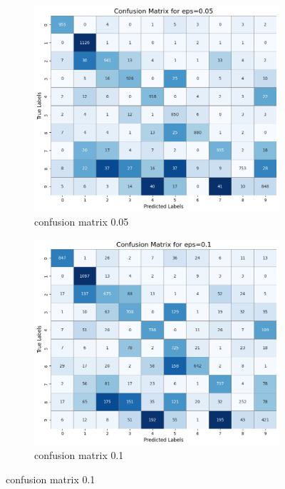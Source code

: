 \documentclass[11pt,onside]{article}
\begin{document}
\begin{figure}[h]
  \centering
  \begin{subfigure}[b]{0.49\textwidth}
    \centering
    \includegraphics[width=\textwidth]{V2_images/target_confusion_matrix_eps_0.05_attack_1.png}
    \caption{confusion matrix 0.05}
    \label{fig:image1}
  \end{subfigure}
  \hfill
  \begin{subfigure}[b]{0.49\textwidth}
    \centering
    \includegraphics[width=\textwidth]{V2_images/target_confusion_matrix_eps_0.1_attack_1.png}
    \caption{confusion matrix 0.1}
    \label{fig:image2}
  \end{subfigure}
  \label{fig:images}
\end{figure}
\end{document}
